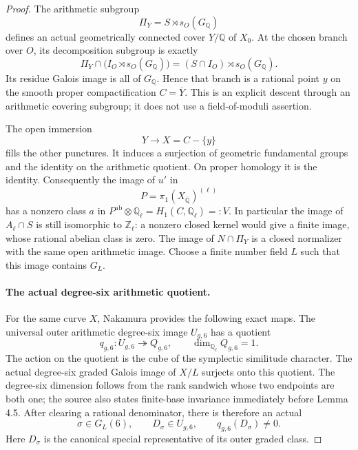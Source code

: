 \documentclass[11pt]{article}
\theoremstyle{definition}\newtheorem{definition}[theorem]{Definition}
\begin{document}
\begin{proof}
The arithmetic subgroup
\[
                  \Pi_Y=S\rtimes s_O(G_{\mathbb Q})
\]
defines an actual geometrically connected cover \(Y/\mathbb Q\)
of \(X_0\).  At the chosen branch over \(O\), its decomposition
subgroup is exactly
\[
 \Pi_Y\cap\bigl(I_O\rtimes s_O(G_{\mathbb Q})\bigr)
               =(S\cap I_O)\rtimes s_O(G_{\mathbb Q}).
\]
Its residue Galois image is all of \(G_{\mathbb Q}\).
Hence that branch is a rational point \(y\) on the smooth
proper compactification \(C=\overline Y\).
This is an explicit descent through an arithmetic covering
subgroup; it does not use a field-of-moduli assertion.

The open immersion
\[
                  Y\longrightarrow X=C-\{y\}
\]
fills the other punctures.  It induces a surjection of geometric
fundamental groups and the identity on the arithmetic quotient.
On proper homology it is the identity.
Consequently the image of \(u'\) in
\[
                         P=\pi_1(X_{\overline{\mathbb Q}})^{(\ell)}
\]
has a nonzero class \(a\) in
\(P^{\mathrm{ab}}\otimes\mathbb Q_\ell
 =H_1(C,\mathbb Q_\ell)=:V\).
In particular the image of \(A_\ell\cap S\) is still
isomorphic to \(\mathbb Z_\ell\): a nonzero closed kernel
would give a finite image, whose rational abelian class is zero.
The image of \(N\cap\Pi_Y\) is a closed normalizer with the
same open arithmetic image.
Choose a finite number field \(L\) such that this image
contains \(G_L\).

\paragraph{The actual degree-six arithmetic quotient.}
For the same curve \(X\), Nakamura
\cite[Corollary 4.2 and the table in 4.3, p.~115;
Lemma 4.5, p.~116; (4.7.1)--(4.7.2), p.~117]{Nakamura1996}
provides the following exact maps.
The universal outer arithmetic degree-six image \(U_{g,6}\)
has a quotient
\[
                  q_{g,6}:U_{g,6}\twoheadrightarrow Q_{g,6},
 \qquad \dim_{\mathbb Q_\ell}Q_{g,6}=1.
\]
The action on the quotient is the cube of the symplectic
similitude character.
The actual degree-six graded Galois image of \(X/L\)
surjects onto this quotient.
The degree-six dimension follows from the rank sandwich
whose two endpoints are both one; the source also states
finite-base invariance immediately before Lemma 4.5.
After clearing a rational denominator, there is therefore
an actual
\[
 \sigma\in G_L(6),\qquad D_\sigma\in U_{g,6},\qquad
                              q_{g,6}(D_\sigma)\neq0.
\]
Here \(D_\sigma\) is the canonical special representative
of its outer graded class.


\end{proof}
\end{document}
